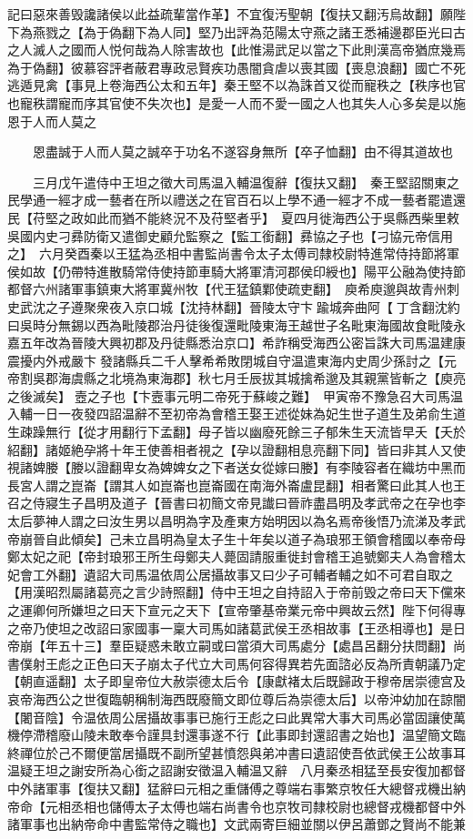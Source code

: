 記曰惡來善毁讒諸侯以此益疏輩當作革】不宜復汚聖朝【復扶又翻汚烏故翻】願陛下為燕戮之【為于偽翻下為人同】堅乃出評為范陽太守燕之諸王悉補邊郡臣光曰古之人滅人之國而人悦何哉為人除害故也【此惟湯武足以當之下此則漢高帝猶庶幾焉為于偽翻】彼慕容評者蔽君專政忌賢疾功愚闇貪虐以喪其國【喪息浪翻】國亡不死逃遁見禽【事見上卷海西公太和五年】秦王堅不以為誅首又從而寵秩之【秩序也官也寵秩謂寵而序其官使不失次也】是愛一人而不愛一國之人也其失人心多矣是以施恩于人而人莫之

　　恩盡誠于人而人莫之誠卒于功名不遂容身無所【卒子恤翻】由不得其道故也

　　三月戊午遣侍中王坦之徵大司馬温入輔温復辭【復扶又翻】　秦王堅詔關東之民學通一經才成一藝者在所以禮送之在官百石以上學不通一經才不成一藝者罷遣還民【苻堅之政如此而猶不能終況不及苻堅者乎】　夏四月徙海西公于吳縣西柴里敕吳國内史刁彞防衛又遣御史顧允監察之【監工銜翻】彞協之子也【刁協元帝信用之】　六月癸酉秦以王猛為丞相中書監尚書令太子太傅司隸校尉特進常侍持節將軍侯如故【仍帶特進散騎常侍使持節車騎大將軍清河郡侯印綬也】陽平公融為使持節都督六州諸軍事鎮東大將軍冀州牧【代王猛鎮鄴使疏吏翻】　庾希庾邈與故青州刺史武沈之子遵聚衆夜入京口城【沈持林翻】晉陵太守卞踰城奔曲阿【丁含翻沈約曰吳時分無錫以西為毗陵郡治丹徒後復還毗陵東海王越世子名毗東海國故食毗陵永嘉五年改為晉陵大興初郡及丹徒縣悉治京口】希詐稱受海西公密旨誅大司馬温建康震擾内外戒嚴卞發諸縣兵二千人擊希希敗閉城自守温遣東海内史周少孫討之【元帝割吳郡海虞縣之北境為東海郡】秋七月壬辰拔其城擒希邈及其親黨皆斬之【庾亮之後滅矣】壼之子也【卞壼事元明二帝死于蘇峻之難】　甲寅帝不豫急召大司馬温入輔一日一夜發四詔温辭不至初帝為會稽王娶王述從妹為妃生世子道生及弟俞生道生疎躁無行【從才用翻行下孟翻】母子皆以幽廢死餘三子郁朱生天流皆早夭【夭於紹翻】諸姬絶孕將十年王使善相者視之【孕以證翻相息亮翻下同】皆曰非其人又使視諸婢媵【媵以證翻卑女為婢婢女之下者送女從嫁曰媵】有李陵容者在織坊中黑而長宮人謂之崑崙【謂其人如崑崙也崑崙國在南海外崙盧昆翻】相者驚曰此其人也王召之侍寢生子昌明及道子【晉書曰初簡文帝見䜟曰晉祚盡昌明及孝武帝之在孕也李太后夢神人謂之曰汝生男以昌明為字及產東方始明因以為名焉帝後悟乃流涕及孝武帝崩晉自此傾矣】己未立昌明為皇太子生十年矣以道子為琅邪王領會稽國以奉帝母鄭太妃之祀【帝封琅邪王所生母鄭夫人薨固請服重徙封會稽王追號鄭夫人為會稽太妃會工外翻】遺詔大司馬温依周公居攝故事又曰少子可輔者輔之如不可君自取之【用漢昭烈屬諸葛亮之言少詩照翻】侍中王坦之自持詔入于帝前毁之帝曰天下儻來之運卿何所嫌坦之曰天下宣元之天下【宣帝肇基帝業元帝中興故云然】陛下何得專之帝乃使坦之改詔曰家國事一稟大司馬如諸葛武侯王丞相故事【王丞相導也】是日帝崩【年五十三】羣臣疑惑未敢立嗣或曰當須大司馬處分【處昌呂翻分扶問翻】尚書僕射王彪之正色曰天子崩太子代立大司馬何容得異若先面諮必反為所責朝議乃定【朝直遥翻】太子即皇帝位大赦崇德太后令【康獻褚太后既歸政于穆帝居崇德宫及哀帝海西公之世復臨朝稱制海西既廢簡文即位尊后為崇德太后】以帝沖幼加在諒闇【闍音陰】令温依周公居攝故事事已施行王彪之曰此異常大事大司馬必當固讓使萬機停滯稽廢山陵未敢奉令謹具封還事遂不行【此事即封還詔書之始也】温望簡文臨終禪位於己不爾便當居攝既不副所望甚憤怨與弟冲書曰遺詔使吾依武侯王公故事耳温疑王坦之謝安所為心銜之詔謝安徵温入輔温又辭　八月秦丞相猛至長安復加都督中外諸軍事【復扶又翻】猛辭曰元相之重儲傅之尊端右事繁京牧任大總督戎機出納帝命【元相丞相也儲傅太子太傅也端右尚書令也京牧司隸校尉也總督戎機都督中外諸軍事也出納帝命中書監常侍之職也】文武兩寄巨細並關以伊呂蕭鄧之賢尚不能兼